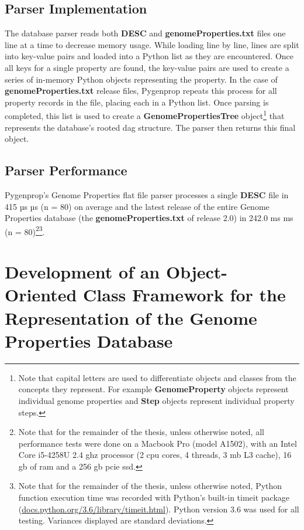 \subsection{Parser Implementation}

The database parser reads both \textbf{DESC} and \textbf{genomeProperties.txt} files one line at a time to decrease memory usage. While loading line by line, lines are split into key-value pairs and loaded into a Python list as they are encountered. Once all keys for a single property are found, the key-value pairs are used to create a series of in-memory Python objects representing the property. In the case of \textbf{genomeProperties.txt} release files, Pygenprop repeats this process for all property records in the file, placing each in a Python list.  Once parsing is completed, this list is used to create a \textbf{GenomePropertiesTree} object\footnote{Note that capital letters are used to differentiate objects and classes from the concepts they represent. For example \textbf{GenomeProperty} objects represent individual genome properties and \textbf{Step} objects represent individual property steps.} that represents the database's rooted \gls{dag} structure. The parser then returns this final object.

\subsection{Parser Performance}

Pygenprop's Genome Properties flat file parser processes a single \textbf{DESC} file in 415 µs  µs (\gls{n} = 80) on average and the latest release of the entire Genome Properties database (the \textbf{genomeProperties.txt} of release 2.0) in 242.0 ms  ms (\gls{n} = 80)\footnote{Note that for the remainder of the thesis, unless otherwise noted, all performance tests were done on a Macbook Pro (model A1502), with an Intel Core i5-4258U 2.4 \gls{ghz} processor (2 \gls{cpu} cores, 4 threads, 3 \gls{mb} L3 cache), 16 \gls{gb} of \gls{ram} and a 256 \gls{gb}  \gls{pcie} \gls{ssd}.}\footnote{Note that for the remainder of the thesis, unless otherwise noted, Python function execution time was recorded with Python's built-in timeit package (\href{http://docs.python.org/3.6/library/timeit.html}{docs.python.org/3.6/library/timeit.html}). Python version 3.6 was used for all testing. Variances displayed are standard deviations.}.

\section{Development of an Object-Oriented Class Framework for the Representation of the Genome Properties Database} \label{genomeprop-oop}

